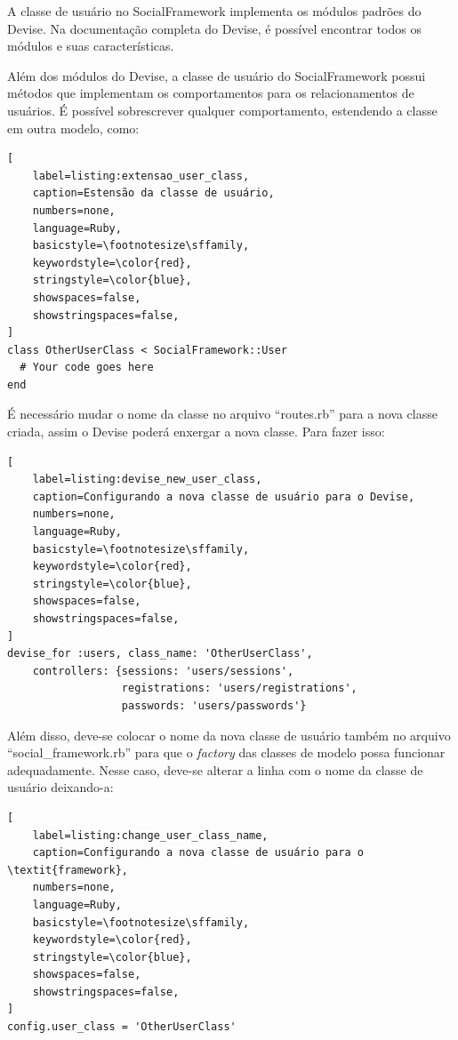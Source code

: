 A classe de usuário no SocialFramework implementa os módulos padrões do Devise. Na documentação completa do Devise, é possível encontrar todos os módulos e suas características.

Além dos módulos do Devise, a classe de usuário do SocialFramework possui métodos que implementam os comportamentos para os relacionamentos de usuários. É possível sobrescrever qualquer comportamento, estendendo a classe em outra modelo, como:

\begin{lstlisting}[
    label=listing:extensao_user_class,
    caption=Estensão da classe de usuário,
    numbers=none,
    language=Ruby,
    basicstyle=\footnotesize\sffamily,
    keywordstyle=\color{red},
    stringstyle=\color{blue},
    showspaces=false,
    showstringspaces=false,
]
class OtherUserClass < SocialFramework::User
  # Your code goes here
end
\end{lstlisting}

É necessário mudar o nome da classe no arquivo ``routes.rb'' para a nova classe criada, assim o Devise poderá enxergar a nova classe. Para fazer isso:

\begin{lstlisting}[
    label=listing:devise_new_user_class,
    caption=Configurando a nova classe de usuário para o Devise,
    numbers=none,
    language=Ruby,
    basicstyle=\footnotesize\sffamily,
    keywordstyle=\color{red},
    stringstyle=\color{blue},
    showspaces=false,
    showstringspaces=false,
]
devise_for :users, class_name: 'OtherUserClass',
    controllers: {sessions: 'users/sessions',
                  registrations: 'users/registrations',
                  passwords: 'users/passwords'}
\end{lstlisting}

Além disso, deve-se colocar o nome da nova classe de usuário também no arquivo ``social\_framework.rb'' para que o \textit{factory} das classes de modelo possa funcionar adequadamente. Nesse caso, deve-se alterar a linha com o nome da classe de usuário deixando-a:

\begin{lstlisting}[
    label=listing:change_user_class_name,
    caption=Configurando a nova classe de usuário para o \textit{framework},
    numbers=none,
    language=Ruby,
    basicstyle=\footnotesize\sffamily,
    keywordstyle=\color{red},
    stringstyle=\color{blue},
    showspaces=false,
    showstringspaces=false,
]
config.user_class = 'OtherUserClass'
\end{lstlisting}

